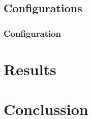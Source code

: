 \documentclass[we,final,11pt,oneside,openany]{uantwerpenbamathesis}
\begin{document}
\lipsum[67]

\section{Configurations}
\label{sec:configurations}

\subsection{Configuration}
\label{subsec:configuration}

\lipsum[67]

\chapter{Results}
\label{ch:results}

\chapter{Conclussion}
\label{ch:conclussion}

\appendix



\end{document}
